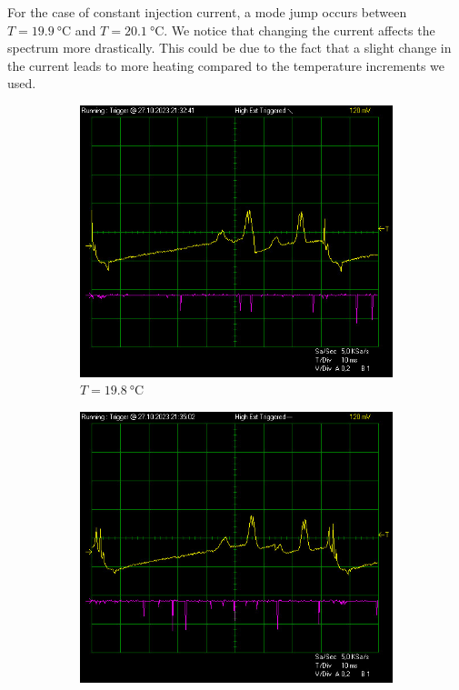 \documentclass{article}
\begin{document}
\pagebreak{}

For the case of constant injection current, a mode jump occurs between $T = \SI{19.9}{\celsius}$ and $T = \SI{20.1}{\celsius}$. We notice that changing the current affects the spectrum more drastically. This could be due to the fact that a slight change in the current leads to more heating compared to the temperature increments we used.

\begin{figure}[h]
    \centering
    \begin{subfigure}[b]{0.3\textwidth}
        \includegraphics[width=\textwidth]{Figures/2/Iconst118mA/198.jpg}
        \caption{$T = \SI{19.8}{\celsius}$}
        \label{fig:198C}
    \end{subfigure}
    \begin{subfigure}[b]{0.3\textwidth}
        \includegraphics[width=\textwidth]{Figures/2/Iconst118mA/199.jpg}

\end{subfigure}
\end{figure}
\end{document}
